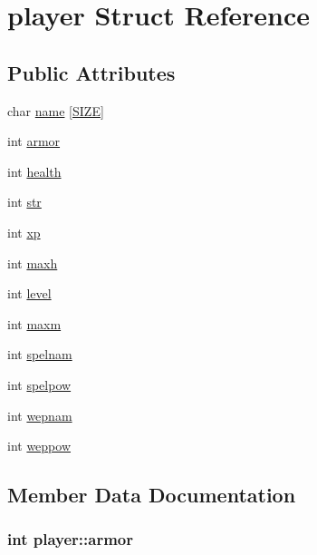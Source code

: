 \hypertarget{structplayer}{}\section{player Struct Reference}
\label{structplayer}
\subsection*{Public Attributes}
\begin{DoxyCompactItemize}
\item 
char \hyperlink{structplayer_af44d7cb9748ae809edbeb68a34a282e6}{name} \mbox{[}\hyperlink{main_8cpp_af08413a3ee12cf78b0ddeea71e2648b3}{S\+I\+Z\+E}\mbox{]}
\item 
int \hyperlink{structplayer_a63c20d062adde3b7b752d1640a36258e}{armor}
\item 
int \hyperlink{structplayer_a46e908a72ca54baf54330861bbc56713}{health}
\item 
int \hyperlink{structplayer_a3f5afbd398724555af2babef3175b4f5}{str}
\item 
int \hyperlink{structplayer_a370a68f0051f4990d825e8847d2ddc09}{xp}
\item 
int \hyperlink{structplayer_a7b5fcdcdf1f304e5e703dfdd4901a5a4}{maxh}
\item 
int \hyperlink{structplayer_a9b6e01bd4eaa3f7a03330320a231be6e}{level}
\item 
int \hyperlink{structplayer_a644ba7d5953a56592eb19010dff9d7b7}{maxm}
\item 
int \hyperlink{structplayer_a145144e7e5c7fbcb58edca217029b530}{spelnam}
\item 
int \hyperlink{structplayer_a0f0f1c33783beaaade2cdd81a5667f98}{spelpow}
\item 
int \hyperlink{structplayer_af54eae2ad746a6678b9128b652abf56e}{wepnam}
\item 
int \hyperlink{structplayer_ac15eb781c66d6a0af1d5f1898f7ec64b}{weppow}
\end{DoxyCompactItemize}


\subsection{Member Data Documentation}
\hypertarget{structplayer_a63c20d062adde3b7b752d1640a36258e}{}
\subsubsection[{armor}]{\setlength{\rightskip}{0pt plus 5cm}int player\+::armor}\label{structplayer_a63c20d062adde3b7b752d1640a36258e}
\hypertarget{structplayer_a46e908a72ca54baf54330861bbc56713}{}
